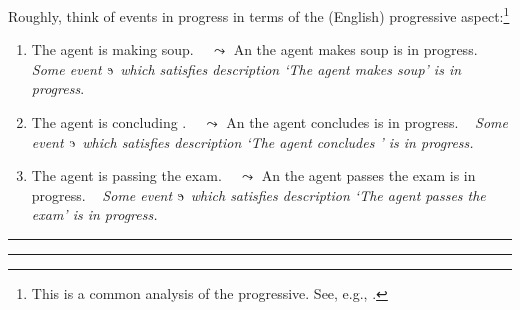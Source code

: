 \documentclass[10pt]{article}
\newcommand\sepLine{
  \vfill
  \par\noindent\rule{\textwidth}{0.4pt}%
  \vspace{-10pt}%
  \par\noindent\rule{\textwidth}{0.4pt}
  \vfill}
\begin{document}
\begin{note}
  Roughly, think of events in progress in terms of the (English) progressive aspect:\footnote{
    This is a common analysis of the progressive.
    See, e.g., \cite{Bennett:1972uw,Dowty:1979vq,Parsons:1990aa,Landman:1992wh,Portner:1998um}.
  }
  \begin{enumerate}
  \item
    The agent is making soup.%
    \mbox{ } \hfill \(\leadsto\) An  the agent makes soup is in progress.\newline
    \mbox{ }\hfill \emph{{\color{gray} Some event \(\eXdn{}\) which satisfies description} {\color{darkgray} `The agent makes soup'} {\color{gray} is in progress}}.
  \item
    The agent is concluding \rootsCon{}.%
    \mbox{ } \hfill \(\leadsto\) An  the agent concludes \rootsCon{} is in progress.\newline
    \mbox{ }\hfill \emph{{\color{gray} Some event \(\eXdn{}\) which satisfies description} {\color{darkgray} `The agent concludes \rootsCon{}' } {\color{gray} is in progress}.}
  \item
    The agent is passing the exam.%
    \mbox{ } \hfill \(\leadsto\) An  the agent passes the exam is in progress.\newline
    \mbox{ }\hfill \emph{{\color{gray} Some event \(\eXdn{}\) which satisfies description} {\color{darkgray} `The agent passes the exam'} {\color{gray} is in progress}.}
  \end{enumerate}
\begin{comment}
  This doesn't quite work, as the progressive has some quirks.
  Still, it's close enough to fix a grasp on events in progress.
\end{comment}
\end{note}

\sepLine
\end{document}
